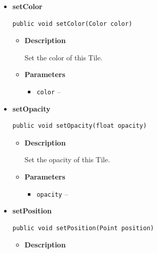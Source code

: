 {{{{{{{{{{{{\begin{itemize}
{\begin{itemize}
{Display this tile on the submitted map.
}
\item{
{\bf  Parameters}
  \begin{itemize}
   \item{
\texttt{map} -- }
  \end{itemize}
}%
\end{itemize}
}%
\item{ 
\hypertarget{Grid.Tile.setColor(Color)}{{\bf  setColor}\\}
\begin{lstlisting}[frame=none]
public void setColor(Color color)\end{lstlisting} %
\begin{itemize}
\item{
{\bf  Description}

Set the color of this Tile.
}
\item{
{\bf  Parameters}
  \begin{itemize}
   \item{
\texttt{color} -- }
  \end{itemize}
}%
\end{itemize}
}%
\item{ 
\hypertarget{Grid.Tile.setOpacity(float)}{{\bf  setOpacity}\\}
\begin{lstlisting}[frame=none]
public void setOpacity(float opacity)\end{lstlisting} %
\begin{itemize}
\item{
{\bf  Description}

Set the opacity of this Tile.
}
\item{
{\bf  Parameters}
  \begin{itemize}
   \item{
\texttt{opacity} -- }
  \end{itemize}
}%
\end{itemize}
}%
\item{ 
\hypertarget{Grid.Tile.setPosition(Point)}{{\bf  setPosition}\\}
\begin{lstlisting}[frame=none]
public void setPosition(Point position)\end{lstlisting} %
\begin{itemize}
\item{
{\bf  Description}

}
\end{itemize}}
\end{itemize}}}}}}}}}}}}}
